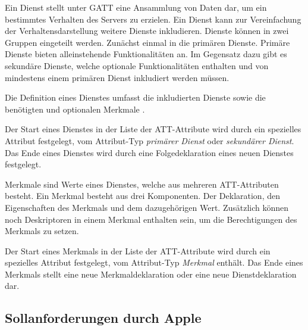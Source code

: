 Ein Dienst stellt unter \ac{GATT} eine Ansammlung von Daten dar, um ein bestimmtes Verhalten des Servers zu erzielen. Ein Dienst kann zur Vereinfachung der Verhaltensdarstellung weitere Dienste inkludieren. Dienste können in zwei Gruppen eingeteilt werden. Zunächst einmal in die primären Dienste. Primäre Dienste bieten alleinstehende Funktionalitäten an. Im Gegensatz dazu gibt es sekundäre Dienste, welche optionale Funktionalitäten enthalten und von mindestens einem primären Dienst inkludiert werden müssen. \cite[S.~281]{bluetoothCore}

Die Definition eines Dienstes umfasst die inkludierten Dienste sowie die benötigten und optionalen Merkmale \cite[S.~1481]{bluetoothCore}.

Der Start eines Dienstes in der Liste der \ac{ATT}-Attribute wird durch ein spezielles Attribut festgelegt, vom Attribut-Typ \textit{primärer Dienst} oder \textit{sekundärer Dienst}. Das Ende eines Dienstes wird durch eine Folgedeklaration eines neuen Dienstes festgelegt. \cite[S.~1483]{bluetoothCore}

Merkmale sind Werte eines Dienstes, welche aus mehreren \ac{ATT}-Attributen besteht. Ein Merkmal besteht aus drei Komponenten. Der Deklaration, den Eigenschaften des Merkmals und dem dazugehörigen Wert. Zusätzlich können noch Deskriptoren in einem Merkmal enthalten sein, um die Berechtigungen des Merkmals zu setzen. \cite[S.~281]{bluetoothCore}

Der Start eines Merkmals in der Liste der \ac{ATT}-Attribute wird durch ein spezielles Attribut festgelegt, vom Attribut-Typ \textit{Merkmal} enthält. Das Ende eines Merkmals stellt eine neue Merkmaldeklaration oder eine neue Dienstdeklaration dar. \cite[S.~1484ff.]{bluetoothCore}

\subsection{Sollanforderungen durch Apple}
\label{section:appleAnforderungen}

